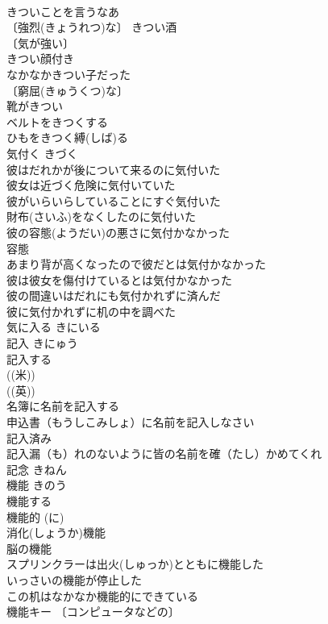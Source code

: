 \documentclass[8pt]{extreport}
\begin{document}
\begin{CJK}{UTF8}{min}
\\	きついことを言うなあ 
\\	〔強烈(きょうれつ)な〕 きつい酒 
\\	〔気が強い〕 
\\	きつい顔付き 
\\	なかなかきつい子だった 
\\	〔窮屈(きゅうくつ)な〕
\\	靴がきつい 
\\	ベルトをきつくする 
\\	ひもをきつく縛(しば)る 
\\	気付く	きづく	
\\	彼はだれかが後について来るのに気付いた 
\\	彼女は近づく危険に気付いていた 
\\	彼がいらいらしていることにすぐ気付いた 
\\	財布(さいふ)をなくしたのに気付いた 
\\	彼の容態(ようだい)の悪さに気付かなかった 
\\	容態　
\\	あまり背が高くなったので彼だとは気付かなかった 
\\	彼は彼女を傷付けているとは気付かなかった 
\\	彼の間違いはだれにも気付かれずに済んだ 
\\	彼に気付かれずに机の中を調べた 
\\	気に入る	きにいる	
\\	記入	きにゅう	
\\	記入する 
\\	((米)) 
\\	((英)) 
\\	名簿に名前を記入する 
\\	申込書（もうしこみしょ）に名前を記入しなさい 
\\	記入済み 
\\	記入漏（も）れのないように皆の名前を確（たし）かめてくれ 
\\	記念	きねん	
\\	機能	きのう	
\\	機能する 
\\	機能的 (に) 
\\	消化(しょうか)機能 
\\	脳の機能 
\\	スプリンクラーは出火(しゅっか)とともに機能した 
\\	いっさいの機能が停止した 
\\	この机はなかなか機能的にできている 
\\	機能キー 〔コンピュータなどの〕

\end{CJK}
\end{document}
